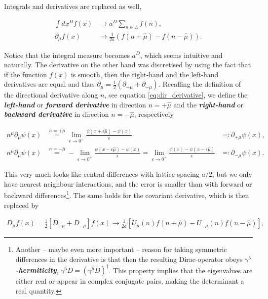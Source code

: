 \documentclass{article}
\theoremstyle{plain} %
\theoremstyle{convention} %
\theoremstyle{remark} %
\def\df#1{\textbf{\textit{#1}}}
\numberwithin{equation}{section}
\begin{document}
Integrals and derivatives are replaced as well,

\begin{align*}
    \int dx^D f(x) &\longrightarrow a^D \sum_{n \in \Lambda} f(n), \\
    \partial_{\mu} f(x) &\longrightarrow \frac{1}{2a} \left( f(n+\hat{\mu}) - f(n-\hat{\mu}) \right).
\end{align*}

Notice that the integral measure becomes $a^D$, which seems intuitive and naturally. The derivative on the other hand was discretised by using the fact that if the function $f(x)$ is smooth, then the right-hand and the left-hand derivatives are equal and thus $\partial_{\mu} = \frac{1}{2}(\partial_{+\mu} + \partial_{-\mu})$. Recalling the definition of the directional derivative along $n$, see equation \eqref{eq:dir_derivative}, we define the \df{left-hand} or \df{forward derivative} in direction $n=+\hat{\mu}$ and the \df{right-hand} or \df{backward derivative} in direction $n=-\hat{\mu}$, respectively

\begin{align*}
    n^{\mu} \partial_{\mu} \psi(x) &\stackrel{n = +\hat{\mu}}{=} \lim_{\epsilon \to 0^{+}} \frac{ \psi(x + \epsilon \hat{\mu}) - \psi(x) }{\epsilon} &\eqqcolon \partial_{+\mu} \psi(x), \\
    n^{\mu} \partial_{\mu} \psi(x) &\stackrel{n = -\hat{\mu}}{=} - \lim_{\epsilon \to 0^{+}} \frac{ \psi(x - \epsilon \hat{\mu}) - \psi(x) }{\epsilon} = \lim_{\epsilon \to 0^{+}} \frac{ \psi(x) - \psi(x - \epsilon \hat{\mu}) }{\epsilon} &\eqqcolon \partial_{-\mu} \psi(x).
\end{align*}


This very much looks like central differences with lattice spacing $a/2$, but we only have nearest neighbour interactions, and the error is smaller than with forward or backward differences\footnote{Another -- maybe even more important -- reason for taking symmetric differences in the derivative is that then the resulting Dirac-operator obeys \df{$\gamma^5$-hermiticity}, $\gamma^5 D = (\gamma^5 D)^{\dagger}$. This property implies that the eigenvalues are either real or appear in complex conjugate pairs, making the determinant a real quantity.}. The same holds for the covariant derivative, which is then replaced by

\begin{align*}
    D_{\mu} f(x) = \frac{1}{2} \left[ D_{+\mu} + D_{-\mu} \right] f(x) \longrightarrow \frac{1}{2a} \left[ U_{\mu}(n) f(n+\hat{\mu}) - U_{-\mu}(n) f(n-\hat{\mu}) \right],
\end{align*}
\end{document}
